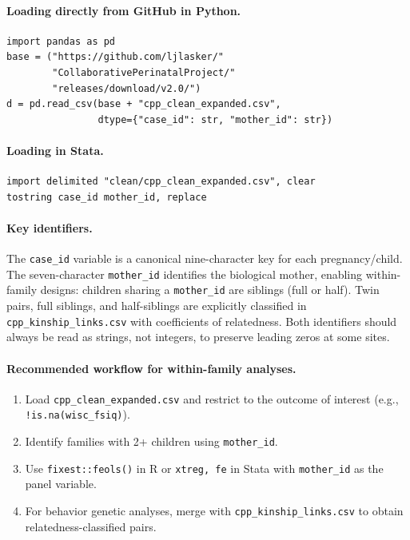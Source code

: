 \documentclass[12pt]{article}
\begin{document}
\paragraph{Loading directly from GitHub in Python.}
\begin{verbatim}
import pandas as pd
base = ("https://github.com/ljlasker/"
        "CollaborativePerinatalProject/"
        "releases/download/v2.0/")
d = pd.read_csv(base + "cpp_clean_expanded.csv",
                dtype={"case_id": str, "mother_id": str})
\end{verbatim}

\paragraph{Loading in Stata.}
\begin{verbatim}
import delimited "clean/cpp_clean_expanded.csv", clear
tostring case_id mother_id, replace
\end{verbatim}

\paragraph{Key identifiers.} The \texttt{case\_id} variable is a canonical nine-character key for each pregnancy/child. The seven-character \texttt{mother\_id} identifies the biological mother, enabling within-family designs: children sharing a \texttt{mother\_id} are siblings (full or half). Twin pairs, full siblings, and half-siblings are explicitly classified in \texttt{cpp\_kinship\_links.csv} with coefficients of relatedness. Both identifiers should always be read as strings, not integers, to preserve leading zeros at some sites.

\paragraph{Recommended workflow for within-family analyses.}
\begin{enumerate}
    \item Load \texttt{cpp\_clean\_expanded.csv} and restrict to the outcome of interest (e.g., \texttt{!is.na(\allowbreak wisc\_fsiq)}).
    \item Identify families with 2+ children using \texttt{mother\_id}.
    \item Use \texttt{fixest::feols()} in R or \texttt{xtreg, fe} in Stata with \texttt{mother\_id} as the panel variable.
    \item For behavior genetic analyses, merge with \texttt{cpp\_kinship\_links.csv} to obtain relatedness-classified pairs.
\end{enumerate}
\end{document}
